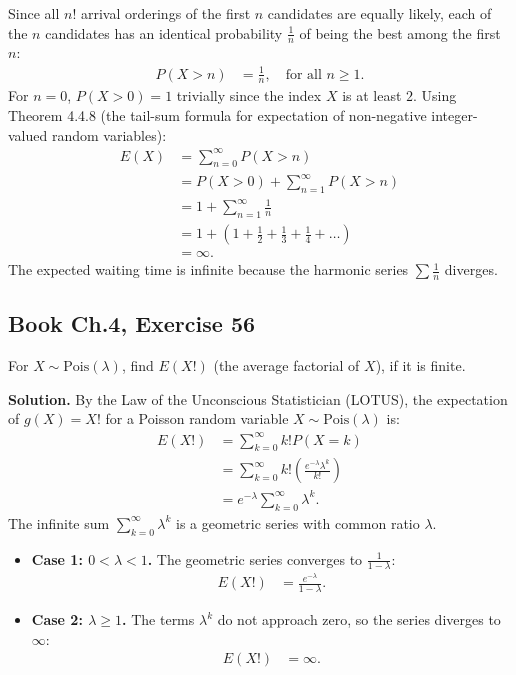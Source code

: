 \documentclass[11pt,a4paper]{article}
\begin{document}
Since all $n!$ arrival orderings of the first $n$ candidates are equally likely, each of the $n$ candidates has an identical probability $\frac{1}{n}$ of being the best among the first $n$:
\begin{align*}
P(X > n) &= \frac{1}{n}, \quad \text{for all } n \ge 1.
\end{align*}
For $n = 0$, $P(X > 0) = 1$ trivially since the index $X$ is at least $2$. Using Theorem 4.4.8 (the tail-sum formula for expectation of non-negative integer-valued random variables):
\begin{align*}
E(X) &= \sum_{n=0}^{\infty} P(X > n) \\
&= P(X > 0) + \sum_{n=1}^{\infty} P(X > n) \\
&= 1 + \sum_{n=1}^{\infty} \frac{1}{n} \\
&= 1 + \left(1 + \frac{1}{2} + \frac{1}{3} + \frac{1}{4} + \dots \right) \\
&= \infty.
\end{align*}
The expected waiting time is infinite because the harmonic series $\sum \frac{1}{n}$ diverges.

\vspace{10pt}
\subsection{Book Ch.4, Exercise 56}
\begin{tcolorbox}[title={Book Ch.4, Exercise 56}]
For $X \sim \text{Pois}(\lambda)$, find $E(X!)$ (the average factorial of $X$), if it is finite.
\end{tcolorbox}

\noindent \textbf{Solution.} By the Law of the Unconscious Statistician (LOTUS), the expectation of $g(X) = X!$ for a Poisson random variable $X \sim \text{Pois}(\lambda)$ is:
\begin{align*}
E(X!) &= \sum_{k=0}^{\infty} k! P(X = k) \\
&= \sum_{k=0}^{\infty} k! \left( \frac{e^{-\lambda} \lambda^k}{k!} \right) \\
&= e^{-\lambda} \sum_{k=0}^{\infty} \lambda^k.
\end{align*}
The infinite sum $\sum_{k=0}^{\infty} \lambda^k$ is a geometric series with common ratio $\lambda$. 
\begin{itemize}
    \item \textbf{Case 1: $0 < \lambda < 1$.} The geometric series converges to $\frac{1}{1 - \lambda}$:
    \begin{align*}
    E(X!) &= \frac{e^{-\lambda}}{1 - \lambda}.
    \end{align*}
    \item \textbf{Case 2: $\lambda \ge 1$.} The terms $\lambda^k$ do not approach zero, so the series diverges to $\infty$:
    \begin{align*}
    E(X!) &= \infty.
    \end{align*}
\end{itemize}
\end{document}
